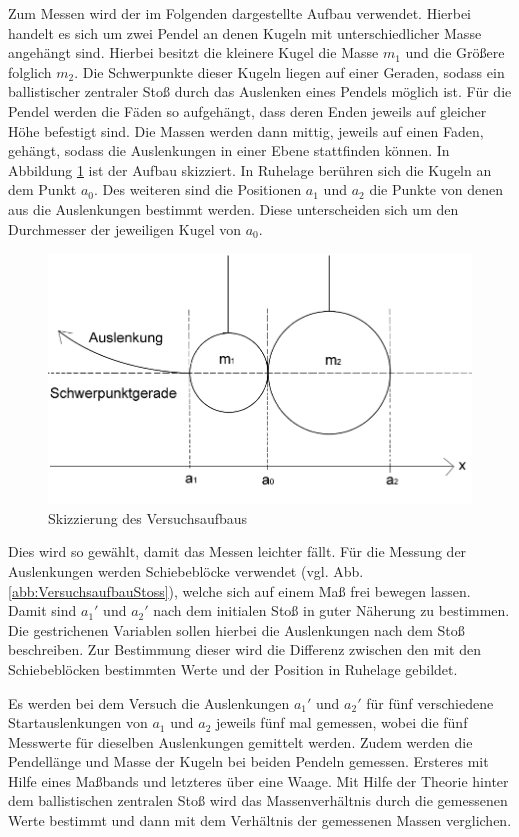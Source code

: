 		Zum Messen wird der im Folgenden dargestellte Aufbau verwendet. Hierbei handelt es sich um zwei Pendel an denen Kugeln mit unterschiedlicher Masse angehängt sind. Hierbei besitzt die kleinere Kugel die Masse $m_1$ und die Größere folglich $m_2$. Die Schwerpunkte dieser Kugeln liegen auf einer Geraden, sodass ein ballistischer zentraler Stoß durch das Auslenken eines Pendels möglich ist. 
		Für die Pendel werden die Fäden so aufgehängt, dass deren Enden jeweils auf gleicher Höhe befestigt sind. Die Massen werden dann mittig, jeweils auf einen Faden, gehängt, sodass die Auslenkungen in einer Ebene stattfinden können. In Abbildung \ref{abb:VersuchsskizzeStoss} ist der Aufbau skizziert. In Ruhelage berühren sich die Kugeln an dem Punkt $a_0$. Des weiteren sind die Positionen $a_1$ und $a_2$ die Punkte von denen aus die Auslenkungen bestimmt werden. Diese unterscheiden sich um den Durchmesser der jeweiligen Kugel von $a_0$.
		\begin{figure}[ht]
			\centering
			\includegraphics[width=\textwidth]{Kugelstoss.png}
			\caption{Skizzierung des Versuchsaufbaus}
			\label{abb:VersuchsskizzeStoss}	
		\end{figure}
		Dies wird so gewählt, damit das Messen leichter fällt. Für die Messung der Auslenkungen werden Schiebeblöcke verwendet (vgl. Abb. \ref{abb:VersuchsaufbauStoss}), welche sich auf einem Maß frei bewegen lassen. Damit sind $a_1'$ und $a_2'$ nach dem initialen Stoß in guter Näherung zu bestimmen. Die gestrichenen Variablen sollen hierbei die Auslenkungen nach dem Stoß beschreiben. Zur Bestimmung dieser wird die Differenz zwischen den mit den Schiebeblöcken bestimmten Werte und der Position in Ruhelage gebildet. 
		
		Es werden bei dem Versuch die Auslenkungen $a_1'$ und $a_2'$ für fünf verschiedene Startauslenkungen von $a_1$ und $a_2$ jeweils fünf mal gemessen, wobei die fünf Messwerte für dieselben Auslenkungen gemittelt werden.
		Zudem werden die Pendellänge und Masse der Kugeln bei beiden Pendeln gemessen. Ersteres mit Hilfe eines Maßbands und letzteres über eine Waage.	
		Mit Hilfe der Theorie hinter dem ballistischen zentralen Stoß wird das Massenverhältnis durch die gemessenen Werte bestimmt und dann mit dem Verhältnis der gemessenen Massen verglichen.
				

